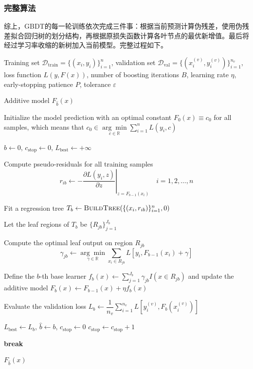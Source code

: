 \subsubsection{完整算法}
综上，GBDT的每一轮训练依次完成三件事：根据当前预测计算伪残差，使用伪残差拟合回归树的划分结构，再根据原损失函数计算各叶节点的最优新增值。最后将经过学习率收缩的新树加入当前模型。完整过程如下。
\begin{algorithm}[H]
	\caption{Gradient Boosting Decision Tree}
	\begin{algorithmic}[1]
		\Require Training set $\mathcal{D}_{\mathrm{train}}=\{(x_i,y_i)\}_{i=1}^n$,
		validation set $\mathcal{D}_{\mathrm{val}}=\{(x_i^{(v)},y_i^{(v)})\}_{i=1}^{n_v}$,
		loss function $L(y,F(x))$,
		number of boosting iterations $B$,
		learning rate $\eta$,
		early-stopping patience $P$,
		tolerance $\varepsilon$
		
		\Ensure Additive model $F_{\hat{b}}(x)$
		
		\State Initialize the model prediction with an optimal constant $F_0(x)\equiv c_0$ for all samples, which means that $c_0\in\underset{c\in\mathbb{R}}{\arg\min}\sum\limits_{i=1}^nL(y_i,c)$
		
		\State $\hat{b}\gets 0$, $c_{\mathrm{stop}}\gets 0$, $L_{\mathrm{best}}\gets +\infty$
		
		\State Compute pseudo-residuals for all training samples
		\begin{equation*}
			r_{ib}\gets-\left.\frac{\partial L(y_i,z)}{\partial z}\right|_{z=F_{b-1}(x_i)}
			\quad i=1,2,\dots,n
		\end{equation*}
		
		\State Fit a regression tree $T_b\gets\Call{BuildTree}{\{(x_i,r_{ib})\}_{i=1}^n, 0}$
		
		\State Let the leaf regions of $T_b$ be $\{R_{jb}\}_{j=1}^{J_b}$

		\State Compute the optimal leaf output on region $R_{jb}$
		\begin{equation*}
			\gamma_{jb}\gets
			\underset{\gamma\in\mathbb{R}}{\arg\min}
			\sum_{x_i\in R_{jb}}
			L[y_i,F_{b-1}(x_i)+\gamma]
		\end{equation*}
		\EndFor
		
		\State Define the $b$-th base learner $f_b(x)\gets\sum\limits_{j=1}^{J_b}\gamma_{jb}I(x\in R_{jb})$ and update the additive model $F_b(x)\gets F_{b-1}(x)+\eta f_b(x)$
		
		\State Evaluate the validation loss $L_b\gets
		\dfrac{1}{n_v}\sum\limits_{i=1}^{n_v}L[y_i^{(v)},F_b(x_i^{(v)})]$
	
		\State $L_{\mathrm{best}}\gets L_b$, $\hat b\gets b$, $c_{\mathrm{stop}}\gets 0$
		\Else
		\State $c_{\mathrm{stop}}\gets c_{\mathrm{stop}}+1$
		\EndIf
		
		\State \textbf{break}
		\EndIf
		\EndFor
		
		\State \Return $F_{\hat{b}}(x)$
	\end{algorithmic}
\end{algorithm}
